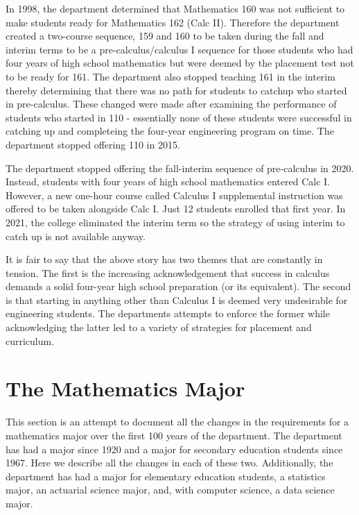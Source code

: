 \documentclass[
]{book}
\begin{document}
In 1998, the department determined that Mathematics 160 was not sufficient to make students ready for Mathematics 162 (Calc II). Therefore the department created a two-course sequence, 159 and 160 to be taken during the fall and interim terms to be a pre-calculus/calculus I sequence for those students who had four years of high school mathematics but were deemed by the placement test not to be ready for 161. The department also stopped teaching 161 in the interim thereby determining that there was no path for students to catchup who started in pre-calculus. These changed were made after examining the performance of students who started in 110 - essentially none of these students were successful in catching up and completeing the four-year engineering program on time. The department stopped offering 110 in 2015.

The department stopped offering the fall-interim sequence of pre-calculus in 2020. Instead, students with four years of high school mathematics entered Calc I. However, a new one-hour course called Calculus I supplemental instruction was offered to be taken alongside Calc I. Just 12 students enrolled that first year. In 2021, the college eliminated the interim term so the strategy of using interim to catch up is not available anyway.

It is fair to say that the above story has two themes that are constantly in tension. The first is the increasing acknowledgement that success in calculus demands a solid four-year high school preparation (or its equivalent). The second is that starting in anything other than Calculus I is deemed very undesirable for engineering students. The departments attempts to enforce the former while acknowledging the latter led to a variety of strategies for placement and curriculum.

\hypertarget{the-mathematics-major-1}{%
\chapter{The Mathematics Major}\label{the-mathematics-major-1}}

This section is an attempt to document all the changes in the requirements for a mathematics major over the first 100 years of the department. The department has had a major since 1920 and a major for secondary education students since 1967. Here we describe all the changes in each of these two. Additionally, the department has had a major for elementary education students, a statistics major, an actuarial science major, and, with computer science, a data science major.
\end{document}
